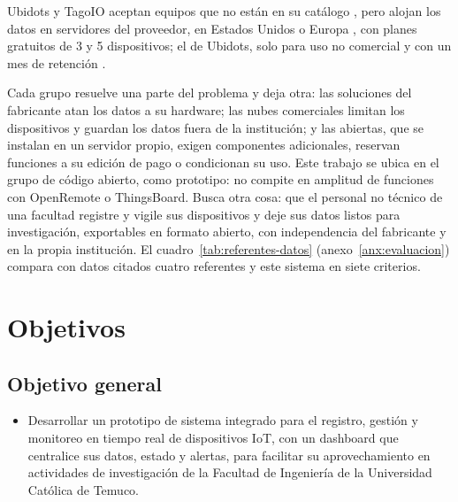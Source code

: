 Ubidots y TagoIO aceptan equipos que no están en su catálogo \parencite{ubidotsdispositivos,tagodecodificador},
pero alojan los datos en servidores del proveedor, en Estados Unidos o Europa
\parencite{ubidotsseguridad,tagoapi}, con planes gratuitos de 3 y 5 dispositivos; el de Ubidots, solo
para uso no comercial y con un mes de retención \parencite{ubidotsstem,tagoprecios}.

Cada grupo resuelve una parte del problema y deja otra: las soluciones del fabricante atan los datos
a su hardware; las nubes comerciales limitan los dispositivos y guardan los datos fuera de la
institución; y las abiertas, que se instalan en un servidor propio, exigen componentes adicionales,
reservan funciones a su edición de pago o condicionan su uso. Este trabajo se ubica en el grupo de
código abierto, como prototipo: no compite en amplitud de funciones con OpenRemote o ThingsBoard. Busca otra cosa: que el personal no técnico de una facultad registre y vigile sus dispositivos y deje sus datos listos para investigación, exportables en formato abierto, con independencia del fabricante y en la propia institución. El cuadro~\ref{tab:referentes-datos} (anexo~\ref{anx:evaluacion}) compara con datos citados cuatro referentes y este sistema en siete criterios.

\section{Objetivos}
\label{sec:objetivos}
\subsection{Objetivo general}
\begin{itemize}
\item Desarrollar un prototipo de sistema integrado para el registro, gestión y monitoreo en tiempo
real de dispositivos IoT, con un dashboard que centralice sus datos, estado y alertas, para facilitar
su aprovechamiento en actividades de investigación de la Facultad de Ingeniería de la Universidad
Católica de Temuco.
\end{itemize}

